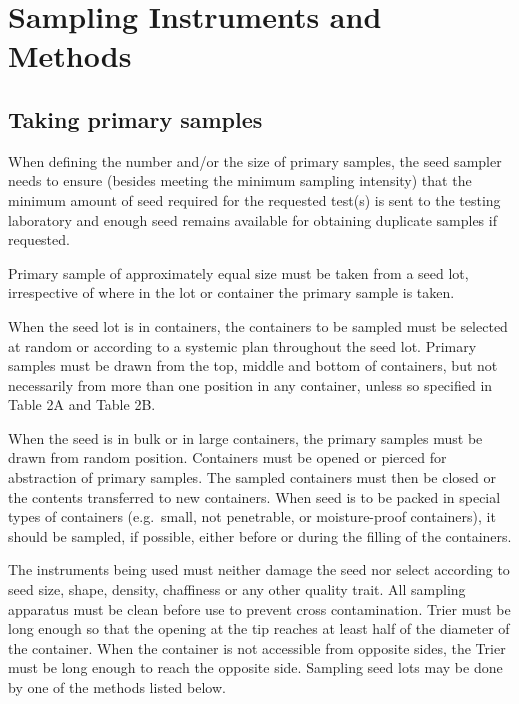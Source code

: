 \documentclass[
]{book}
\begin{document}
\hypertarget{sampling-instruments-and-methods}{%
\section{Sampling Instruments and Methods}\label{sampling-instruments-and-methods}}

\hypertarget{taking-primary-samples}{%
\subsection{Taking primary samples}\label{taking-primary-samples}}

When defining the number and/or the size of primary samples, the seed sampler needs to ensure (besides meeting the minimum sampling intensity) that the minimum amount of seed required for the requested test(s) is sent to the testing laboratory and enough seed remains available for obtaining duplicate samples if requested.

Primary sample of approximately equal size must be taken from a seed lot, irrespective of where in the lot or container the primary sample is taken.

When the seed lot is in containers, the containers to be sampled must be selected at random or according to a systemic plan throughout the seed lot. Primary samples must be drawn from the top, middle and bottom of containers, but not necessarily from more than one position in any container, unless so specified in Table 2A and Table 2B.

When the seed is in bulk or in large containers, the primary samples must be drawn from random position. Containers must be opened or pierced for abstraction of primary samples. The sampled containers must then be closed or the contents transferred to new containers. When seed is to be packed in special types of containers (e.g.~small, not penetrable, or moisture-proof containers), it should be sampled, if possible, either before or during the filling of the containers.

The instruments being used must neither damage the seed nor select according to seed size, shape, density, chaffiness or any other quality trait. All sampling apparatus must be clean before use to prevent cross contamination. Trier must be long enough so that the opening at the tip reaches at least half of the diameter of the container. When the container is not accessible from opposite sides, the Trier must be long enough to reach the opposite side. Sampling seed lots may be done by one of the methods listed below.
\end{document}
